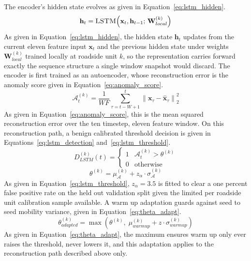 \documentclass[final,5p,twocolumn]{elsarticle}
\theoremstyle{remark}
\theoremstyle{plain}
\begin{document}
The encoder's hidden state evolves as given in
Equation~\eqref{eq:lstm_hidden}.
\begin{equation}
	\mathbf{h}_t = \textsc{LSTM}\!\left(\mathbf{x}_t, \mathbf{h}_{t-1};\, \mathbf{W}_{local}^{(k)}\right)
	\label{eq:lstm_hidden}
\end{equation}
As given in Equation~\eqref{eq:lstm_hidden}, the hidden state $\mathbf{h}_t$
updates from the current eleven feature input $\mathbf{x}_t$ and the
previous hidden state under weights $\mathbf{W}_{local}^{(k)}$ trained
locally at roadside unit $k$, so the representation carries forward
exactly the sequence structure a single window snapshot would discard.
The encoder is first trained as an autoencoder, whose reconstruction error
is the anomaly score given in Equation~\eqref{eq:anomaly_score}.
\begin{equation}
	\mathcal{A}_t^{(k)} = \frac{1}{WF}\sum_{\tau=t-W+1}^{t} \left\|\mathbf{x}_\tau - \hat{\mathbf{x}}_\tau\right\|_2^2
	\label{eq:anomaly_score}
\end{equation}
As given in Equation~\eqref{eq:anomaly_score}, this is the mean squared
reconstruction error over the ten timestep, eleven feature window. On this
reconstruction path, a benign calibrated threshold decision is given in
Equations~\eqref{eq:lstm_detection} and~\eqref{eq:lstm_threshold}.
\begin{equation}
	D_{LSTM}^{(k)}(t) =
	\begin{cases}
		1 & \mathcal{A}_t^{(k)} > \theta^{(k)} \\
		0 & \text{otherwise}
	\end{cases}
	\label{eq:lstm_detection}
\end{equation}
\begin{equation}
	\theta^{(k)} = \mu_{\mathcal{A}}^{(k)} + z_\alpha \cdot \sigma_{\mathcal{A}}^{(k)}
	\label{eq:lstm_threshold}
\end{equation}
As given in Equation~\eqref{eq:lstm_threshold}, $z_\alpha{=}3.5$ is fitted to
clear a one percent false positive rate on the held out validation split
given the limited per roadside unit calibration sample available. A warm up
adaptation guards against seed to seed mobility variance, given in
Equation~\eqref{eq:theta_adapt}.
\begin{equation}
	\theta^{(k)}_{adapted} = \max\!\left(\theta^{(k)},\; \mu_{warmup}^{(k)} + z \cdot \sigma_{warmup}^{(k)}\right)
	\label{eq:theta_adapt}
\end{equation}
As given in Equation~\eqref{eq:theta_adapt}, the maximum ensures warm up
only ever raises the threshold, never lowers it, and this adaptation applies
to the reconstruction path described above only.
\end{document}
